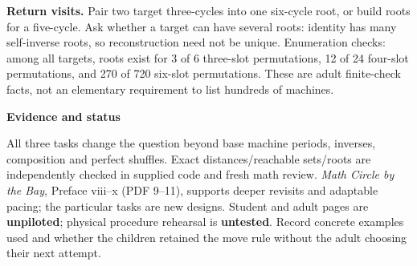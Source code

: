 \documentclass[11pt]{article}
\newcommand\lead[1]{\textbf{#1}\par}
\begin{document}
\textbf{Return visits.} Pair two target three-cycles into one six-cycle root, or build roots for a five-cycle. Ask whether a target can have several roots: identity has many self-inverse roots, so reconstruction need not be unique. Enumeration checks: among all targets, roots exist for 3 of 6 three-slot permutations, 12 of 24 four-slot permutations, and 270 of 720 six-slot permutations. These are adult finite-check facts, not an elementary requirement to list hundreds of machines.

\lead{Evidence and status}
All three tasks change the question beyond base machine periods, inverses, composition and perfect shuffles. Exact distances/reachable sets/roots are independently checked in supplied code and fresh math review. \emph{Math Circle by the Bay}, Preface viii--x (PDF 9--11), supports deeper revisits and adaptable pacing; the particular tasks are new designs. Student and adult pages are \textbf{unpiloted}; physical procedure rehearsal is \textbf{untested}. Record concrete examples used and whether the children retained the move rule without the adult choosing their next attempt.
\end{document}
